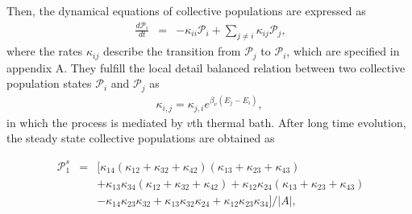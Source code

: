 \documentclass[twocolumn,preprintnumbers,amsmath,amssymb]{revtex4}
\begin{document}
Then, the dynamical equations of collective populations are expressed as
\begin{eqnarray}~\label{p1}
\frac{d\mathcal{P}_i}{dt}&=&-\kappa_{ii}\mathcal{P}_i+\sum_{j{\neq}i}\kappa_{ij}\mathcal{P}_j,
\end{eqnarray}
where the rates $\kappa_{ij}$ describe the transition from $\mathcal{P}_j$ to $\mathcal{P}_i$, which are specified in {\color{blue}appendix A}.
They fulfill the local detail balanced relation between two collective population states $\mathcal{P}_i$ and $\mathcal{P}_j$ as
\begin{eqnarray}
\kappa_{i,j}=\kappa_{j,i}e^{\beta_v(E_j-E_i)},
\end{eqnarray}
in which the process is mediated by $v$th thermal bath.
After long time evolution, the steady state collective populations are obtained as
\begin{comment}
\begin{eqnarray}~\label{pop}
\mathcal{P}^{s}_1&=&(\kappa_{14}\kappa_{22}\kappa_{33}+\kappa_{13}\kappa_{22}\kappa_{34}+\kappa_{12}\kappa_{33}\kappa_{24}\\
&&-\kappa_{14}\kappa_{23}\kappa_{32}+\kappa_{13}\kappa_{32}\kappa_{24}+\kappa_{12}\kappa_{23}\kappa_{34})/|A|,\nonumber
\end{eqnarray}
\begin{eqnarray}
\mathcal{P}^s_{2}&=&(\kappa_{11}\kappa_{33}\kappa_{24}+\kappa_{11}\kappa_{23}\kappa_{34}+\kappa_{14}\kappa_{21}\kappa_{33}\nonumber\\
&&-\kappa_{13}\kappa_{31}\kappa_{24}+\kappa_{14}\kappa_{23}\kappa_{31}+\kappa_{13}\kappa_{21}\kappa_{34})/|A|,\nonumber
\end{eqnarray}
\begin{eqnarray}
\mathcal{P}^s_{3}&=&(\kappa_{11}\kappa_{22}\kappa_{34}+\kappa_{11}\kappa_{32}\kappa_{24}+\kappa_{14}\kappa_{22}\kappa_{31}\nonumber\\
&&-\kappa_{12}\kappa_{21}\kappa_{34}+\kappa_{14}\kappa_{21}\kappa_{32}+\kappa_{12}\kappa_{31}\kappa_{24})/|A|,\nonumber
\end{eqnarray}
\end{comment}
\begin{eqnarray}~\label{pop}
\mathcal{P}^{s}_1&=&[\kappa_{14}(\kappa_{12}+\kappa_{32}+\kappa_{42})(\kappa_{13}+\kappa_{23}+\kappa_{43})\\
&&+\kappa_{13}\kappa_{34}(\kappa_{12}+\kappa_{32}+\kappa_{42})+\kappa_{12}\kappa_{24}(\kappa_{13}+\kappa_{23}+\kappa_{43})\nonumber\\
&&-\kappa_{14}\kappa_{23}\kappa_{32}+\kappa_{13}\kappa_{32}\kappa_{24}+\kappa_{12}\kappa_{23}\kappa_{34}]/|A|,\nonumber
\end{eqnarray}
\end{document}
